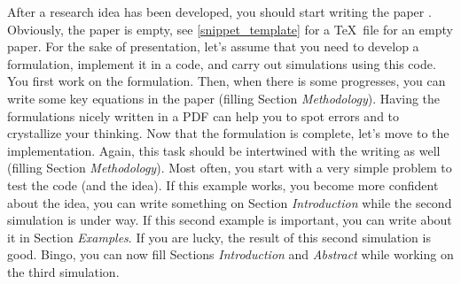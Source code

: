 \documentclass[authoryear,12pta4paper,fleqn]{article}
\numberwithin{equation}{section}
\theoremstyle{remark}
\begin{document}
After a research idea has been developed, you should start writing the paper \citep{Gray:2005a}. Obviously, the paper is empty, see \cref{snippet_template} for a \TeX\ file for an empty paper.
For the sake of presentation, let's assume that you need to develop a formulation, implement it in a code, and carry out simulations using this code. You first work on the formulation. Then, when there is some progresses, you can write some key equations in the paper (filling Section \textit{Methodology}). Having the formulations nicely written in a PDF can help you to spot errors and to crystallize your thinking. Now that the formulation is complete, let's move to the implementation. Again, this task should be intertwined  with the writing as well (filling Section \textit{Methodology}). Most often, you start with a very simple problem to test the code (and the idea). If this example works, you become more confident about the idea, you can write something on Section \textit{Introduction} while the second simulation is under way. If this second example is important, you can write about it in Section \textit{Examples}. If you are lucky, the result of this second simulation is  good. Bingo, you can now fill  Sections \textit{Introduction} and  \textit{Abstract} while working on the third simulation.
\begin{figure}[!h]
\end{figure}
\end{document}
